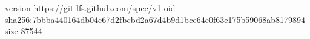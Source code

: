 version https://git-lfs.github.com/spec/v1
oid sha256:7bbba440164db04e67d2fbcbd2a67d4b9d1bce64e0f63e175b59068ab8179894
size 87544
